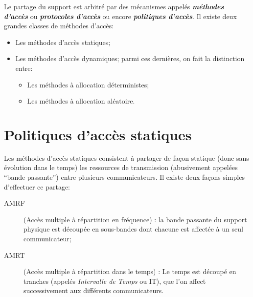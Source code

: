 \documentclass[11pt,english,french]{scrreprt}
\theoremstyle{remark}
\theoremstyle{definition}
\begin{document}
Le partage du support est arbitré par des mécanismes appelés \emph{\textbf{méthodes d'accès}} ou \emph{\textbf{protocoles d'accès}} ou encore \emph{\textbf{politiques d'accès}}. Il existe deux grandes classes de méthodes d'accès: 
\begin{itemize}
	\item Les méthodes d'accès statiques;
	\item Les méthodes d'accès dynamiques; parmi ces dernières, on fait la distinction entre:
	\begin{itemize}
		\item Les méthodes à allocation déterministes;
		\item Les méthodes à allocation aléatoire.
	\end{itemize}
\end{itemize}

\section{Politiques d'accès statiques} %

Les méthodes d'accès statiques consistent à partager de façon statique (donc sans évolution dans le temps) les ressources de transmission (abusivement appelées “bande passante”) entre plusieurs communicateurs. Il existe deux façons simples d'effectuer ce partage: \begin{description}
	\item [AMRF]  (Accès multiple à répartition en fréquence) : la bande passante du support physique est découpée en sous-bandes dont chacune est affectée à un seul communicateur;
	\item [AMRT]  (Accès multiple à répartition dans le temps) : Le temps est découpé en tranches (appelés \emph{Intervalle de Temps} ou IT), que l'on affect successivement aux différents communicateurs.\\
\end{description}
\end{document}
